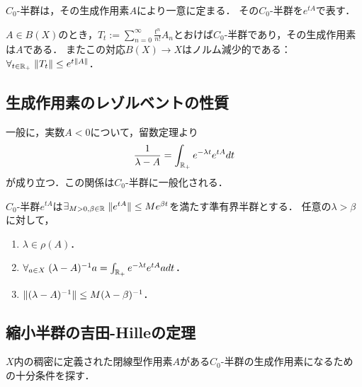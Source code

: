 \documentclass[uplatex,dvipdfmx]{jsreport}
\begin{document}
\begin{theorem}
    $C_0$-半群は，その生成作用素$A$により一意に定まる．
    その$C_0$-半群を$e^{tA}$で表す．
\end{theorem}

\begin{theorem}[整合性]
    $A\in B(X)$のとき，$T_t:=\sum^\infty_{n=0}\frac{t^n}{n!}A_n$とおけば$C_0$-半群であり，その生成作用素は$A$である．
    またこの対応$B(X)\to X$はノルム減少的である：
    $\forall_{t\in\mathbb{R}_+}\;\|T_t\|\le e^{t\|A\|}$．
\end{theorem}

\subsection{生成作用素のレゾルベントの性質}

\begin{tcolorbox}[colframe=ForestGreen, colback=ForestGreen!10!white,breakable,colbacktitle=ForestGreen!40!white,coltitle=black,fonttitle=\bfseries\sffamily,
title=]
    一般に，実数$A<0$について，留数定理より
    \[\frac{1}{\lambda-A}=\int_{\mathbb{R}_+}e^{-\lambda t}e^{tA}dt\]
    が成り立つ．この関係は$C_0$-半群に一般化される．
\end{tcolorbox}

\begin{theorem}
    $C_0$-半群$e^{tA}$は$\exists_{M>0,\beta\in\mathbb{R}}\;\|e^{tA}\|\le Me^{\beta t}$を満たす準有界半群とする．
    任意の$\lambda>\beta$に対して，
    \begin{enumerate}
        \item $\lambda\in\rho(A)$．
        \item $\forall_{a\in X}\;(\lambda-A)^{-1}a=\int_{\mathbb{R}_+}e^{-\lambda t}e^{tA}adt$．
        \item $\|(\lambda-A)^{-1}\|\le M(\lambda-\beta)^{-1}$．
    \end{enumerate}
\end{theorem}

\subsection{縮小半群の吉田-Hilleの定理}

\begin{tcolorbox}[colframe=ForestGreen, colback=ForestGreen!10!white,breakable,colbacktitle=ForestGreen!40!white,coltitle=black,fonttitle=\bfseries\sffamily,
title=]
    $X$内の稠密に定義された閉線型作用素$A$がある$C_0$-半群の生成作用素になるための十分条件を探す．
\end{tcolorbox}
\end{document}
